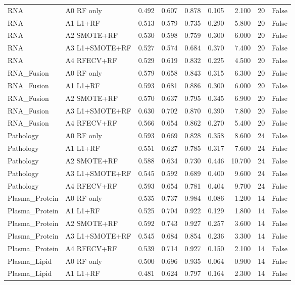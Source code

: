 \begin{table}[t]
\begin{tabular}{llrrrrrrr}
RNA & A0 RF only & 0.492 & 0.607 & 0.878 & 0.105 & 2.100 & 20 & False \\
RNA & A1 L1+RF & 0.513 & 0.579 & 0.735 & 0.290 & 5.800 & 20 & False \\
RNA & A2 SMOTE+RF & 0.530 & 0.598 & 0.759 & 0.300 & 6.000 & 20 & False \\
RNA & A3 L1+SMOTE+RF & 0.527 & 0.574 & 0.684 & 0.370 & 7.400 & 20 & False \\
RNA & A4 RFECV+RF & 0.529 & 0.619 & 0.832 & 0.225 & 4.500 & 20 & False \\
RNA\_Fusion & A0 RF only & 0.579 & 0.658 & 0.843 & 0.315 & 6.300 & 20 & False \\
RNA\_Fusion & A1 L1+RF & 0.593 & 0.681 & 0.886 & 0.300 & 6.000 & 20 & False \\
RNA\_Fusion & A2 SMOTE+RF & 0.570 & 0.637 & 0.795 & 0.345 & 6.900 & 20 & False \\
RNA\_Fusion & A3 L1+SMOTE+RF & 0.630 & 0.702 & 0.870 & 0.390 & 7.800 & 20 & False \\
RNA\_Fusion & A4 RFECV+RF & 0.566 & 0.654 & 0.862 & 0.270 & 5.400 & 20 & False \\
Pathology & A0 RF only & 0.593 & 0.669 & 0.828 & 0.358 & 8.600 & 24 & False \\
Pathology & A1 L1+RF & 0.551 & 0.627 & 0.785 & 0.317 & 7.600 & 24 & False \\
Pathology & A2 SMOTE+RF & 0.588 & 0.634 & 0.730 & 0.446 & 10.700 & 24 & False \\
Pathology & A3 L1+SMOTE+RF & 0.545 & 0.592 & 0.689 & 0.400 & 9.600 & 24 & False \\
Pathology & A4 RFECV+RF & 0.593 & 0.654 & 0.781 & 0.404 & 9.700 & 24 & False \\
Plasma\_Protein & A0 RF only & 0.535 & 0.737 & 0.984 & 0.086 & 1.200 & 14 & False \\
Plasma\_Protein & A1 L1+RF & 0.525 & 0.704 & 0.922 & 0.129 & 1.800 & 14 & False \\
Plasma\_Protein & A2 SMOTE+RF & 0.592 & 0.743 & 0.927 & 0.257 & 3.600 & 14 & False \\
Plasma\_Protein & A3 L1+SMOTE+RF & 0.545 & 0.684 & 0.854 & 0.236 & 3.300 & 14 & False \\
Plasma\_Protein & A4 RFECV+RF & 0.539 & 0.714 & 0.927 & 0.150 & 2.100 & 14 & False \\
Plasma\_Lipid & A0 RF only & 0.500 & 0.696 & 0.935 & 0.064 & 0.900 & 14 & False \\
Plasma\_Lipid & A1 L1+RF & 0.481 & 0.624 & 0.797 & 0.164 & 2.300 & 14 & False \\

\end{tabular}
\end{table}
